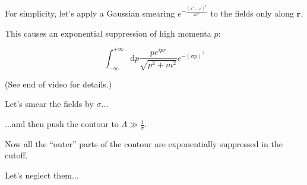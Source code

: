 \documentclass[aspectratio=169]{beamer}
\newcommand{\integrand}{\frac{p e^{ipr}}{\sqrt{p^2 + m^2}}}
\newcommand{\vr}{\mathbf{r}}
\newcommand{\diffop}{\mathop{}\!\mathrm{d}}
\newcommand{\dip}{\diffop p}
\newcommand{\intii}{\int_{-\infty}^{+\infty}}
\begin{document}
\begin{frame}
For simplicity, let's apply a \alert{Gaussian} smearing $e^{-\frac{(x' - x)^2}{2\sigma^2}}$ to the fields only along $\vr$.

\medskip
\pause
This causes an \alert{exponential suppression of high momenta} $p$:

\begin{equation*}
\intii \dip \integrand e^{-(\sigma p)^2}
\end{equation*}

\pause
\medskip
(See end of video for details.)
\end{frame}



\begin{frame}
Let's smear the fields by $\sigma$...

\medskip
\pause
...and then push the contour to $\Lambda \gg \frac{1}{\sigma}$.
\end{frame}




\begin{frame}
Now all the ``outer'' parts of the contour are exponentially suppressed in the cutoff.

\medskip
\pause
Let's neglect them...
\end{frame}


\end{document}
